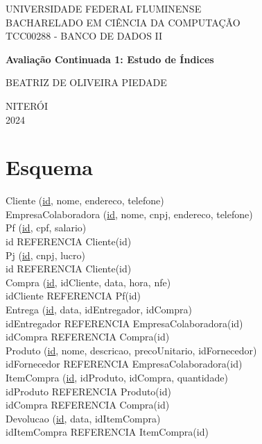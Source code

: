 \documentclass[12pt,a4paper]{article}
\begin{document}
	
\begin{titlepage}
	\centering
	\vspace{2cm}
	
	{UNIVERSIDADE FEDERAL FLUMINENSE} \\ [0.1cm]
	{BACHARELADO EM CIÊNCIA DA COMPUTAÇÃO} \\ [0.1cm]
	{TCC00288 - BANCO DE DADOS II}
	
	\vfill
	
	{\Large \bfseries Avaliação Continuada 1: Estudo de Índices}
	
	\vfill
	
	{BEATRIZ DE OLIVEIRA PIEDADE}
	
	\vfill
	{NITERÓI} \\
	{2024}
\end{titlepage}

\tableofcontents

\newpage
\section{Esquema}

\begin{flushleft}
	Cliente (\underline{id}, nome, endereco, telefone) \\[0.2cm]
	EmpresaColaboradora (\underline{id}, nome, cnpj, endereco, telefone) \\[0.2cm]
	Pf (\underline{id}, cpf, salario) \\
	\quad \quad \quad \quad id REFERENCIA Cliente(id) \\[0.2cm]
	Pj (\underline{id}, cnpj, lucro) \\
	\quad \quad \quad \quad id REFERENCIA Cliente(id) \\[0.2cm]
	Compra (\underline{id}, idCliente, data, hora, nfe) \\
	\quad \quad \quad \quad idCliente REFERENCIA Pf(id) \\[0.2cm]
	Entrega (\underline{id}, data, idEntregador, idCompra) \\
	\quad \quad \quad \quad idEntregador REFERENCIA EmpresaColaboradora(id) \\
	\quad \quad \quad \quad idCompra REFERENCIA Compra(id) \\[0.2cm]
	Produto (\underline{id}, nome, descricao, precoUnitario, idFornecedor) \\
	\quad \quad \quad \quad idFornecedor REFERENCIA EmpresaColaboradora(id) \\[0.2cm]
	ItemCompra (\underline{id}, idProduto, idCompra, quantidade) \\
	\quad \quad \quad \quad idProduto REFERENCIA Produto(id) \\
	\quad \quad \quad \quad idCompra REFERENCIA Compra(id) \\[0.2cm]
	Devolucao (\underline{id}, data, idItemCompra) \\
	\quad \quad \quad \quad idItemCompra REFERENCIA ItemCompra(id) \\
\end{flushleft}
\end{document}
